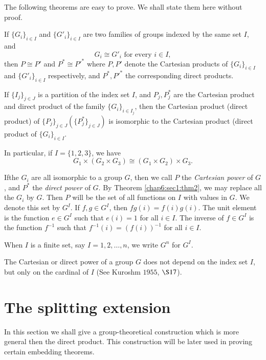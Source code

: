 The following theorems are easy to prove. We shall state them here
without proof. 

\begin{theorem}\label{chap6:sec1:thm2} %
  If $\{ G_i\}_{i \in  I}$ and $\{G'_i\}_{i \in  I}$ are
  two families of groups indexed by the same set $I$, and  
  $$
  G_i \cong G'_i \text{ for every } i \in  I,
  $$
  then $P \cong P'$ and $P^* \cong P'^*$ where $P, P'$ denote the
  Cartesian products of $\{G_i\}_{i \in  I}$ and $\{ G'_i\}_{i
    \in  I}$ respectively, and $P^*, P'^*$ the corresponding
  direct products. 
\end{theorem}

\begin{theorem}\label{chap6:sec1:thm3} %
  If $\{ I_j \}_{j \in  J}$ is a partition of the index set
  $I$, and $P_j, P^*_j$ are the Cartesian product and direct product
  of the family  $\{G_i \}_{i \in  I_j}$, then the Cartesian
  product (direct product) of  $\{ P_j\}_{j \in  J} (\{
  P^*_j\}_{j \in  J})$ is isomorphic to the Cartesian product
  (direct product of  $\{ G_i\}_{i \in  I}$.  
\end{theorem}

In particular, if $I= \{ 1, 2, 3 \}$, we have
$$
G_1 \times (G_2 \times G_3) \cong (G_1 \times G_2) \times G_3. 
$$

If\pageoriginale the $G_i$ are all isomorphic to  a group $G$, then we call $P$ the
\textit{ Cartesian power} of $G$, and $P^*$ the \textit{direct power}
of $G$. By Theorem \ref{chap6:sec1:thm2}, we may replace all the $G_i$ by $G$. Then $P$
will be the set of all functions on $I$ with values in $G$. We denote
this set by $G^I$. If $f, g \in  G^I$, then $fg(i)= f(i)
g(i)$. The unit element is the function $e \in  G^I$ such that
$e(i) =1$ for all $i \in  I$. The inverse of $f \in 
G^I$ is the function $f^{-1}$ such that $f^{-1}(i) =(f(i))^{-1}$ for
all $i \in  I$. 

When $I$ is a finite set, say $I= 1, 2, \ldots,  n$, we write $G^n$ for $G^I$.

The Cartesian or direct power of a group $G$ does not depend on the
index set $I$, but only on the cardinal of $I$ (See Kuroshm  $1955$,
$\S 17$). 

\section{The splitting extension}\label{chap6:sec2}%

In this section we shall give a group-theoretical construction which
is more general then the direct product. This construction will be
later used in proving certain embedding theorems. 

